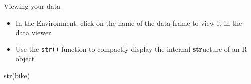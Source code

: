 \documentclass[
  ignorenonframetext,
]{beamer}
\newenvironment{Shaded}{\begin{snugshade}}{\end{snugshade}}
\newcommand{\FunctionTok}[1]{\textcolor[rgb]{0.00,0.00,0.00}{#1}}
\newcommand{\NormalTok}[1]{#1}
\begin{document}
\begin{frame}[fragile]{Viewing your data}
\protect\hypertarget{viewing-your-data}{}
\begin{itemize}
\item
  In the Environment, click on the name of the data frame to view it in
  the data viewer
\item
  Use the \texttt{str()} function to compactly display the internal
  \textbf{str}ucture of an R object
\end{itemize}

\begin{Shaded}
\begin{Highlighting}[]
\FunctionTok{str}\NormalTok{(bike)}
\end{Highlighting}
\end{Shaded}


\end{frame}
\end{document}
